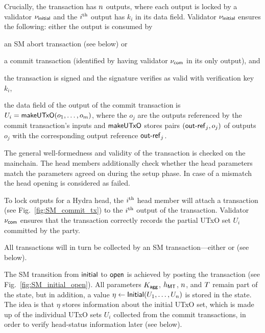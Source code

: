 Crucially, the \mtxInit{} transaction has $n$ outputs, where each
output is locked by a validator $\nu_\mathsf{initial}$ and the $i^{\text{th}}$ output has
$k_i$ in its data field.  Validator $\nu_\mathsf{initial}$ ensures the following:
either the output is consumed by \begin{menumerate} \item  an SM abort transaction (see
below) or \item a commit transaction (identified by having validator
$\nu_\mathsf{com}$ in its only output), and
\begin{menumerate}
\item the transaction is signed and the signature verifies as valid with verification key $k_i$,
\item the data field of the output of the commit transaction is
  $U_i = \mathsf{makeUTxO}(o_1,\ldots,o_m)$, where the $o_j$ are the outputs
  referenced by the commit transaction's inputs and $\mathsf{makeUTxO}$
  stores pairs $(\mathsf{out\textsf{-}{}ref}_j,o_j)$ of outputs $o_j$ with the
  corresponding output reference $\mathsf{out\textsf{-}{}ref}_j$.
\end{menumerate}
\end{menumerate}

The general well-formedness and validity of the \mtxInit{}
transaction is checked on the mainchain. The head members additionally check whether the head parameters
match the parameters agreed on during the setup phase. In case of a
mismatch the head opening is considered as failed.


To lock outputs %
for a Hydra head, the $i^{\text{th}}$
head member will attach a \mtxCom{} transaction (see
Fig.~\ref{fig:SM_commit_tx}) to the $i^{\text{th}}$ output of the
\mtxInit{} transaction.  Validator $\nu_\mathsf{com}$ ensures that the \mtxCom{}
transaction correctly records the partial UTxO set $U_i$ committed
by the party.

All \mtxCom{} transactions will in turn be collected by an SM
transaction---either \mtxCCom{} or \mtxAbort{} (see below).


 The SM transition from $\mathsf{initial}$
to $\mathsf{open}$ is achieved by posting the \mtxCCom{} transaction (see
Fig.~\ref{fig:SM_initial_open}).  All parameters $K_{\mathsf{agg}}$, $h_{\mathsf{MT}}$,
$n$, and $T$ remain part of the state, but in addition, a value
$\eta \gets \mathsf{Initial}(U_1,\ldots,U_n)$ is stored in the state.
The idea is that $\eta$ stores information about the initial UTxO set,
which is made up of the individual UTxO sets $U_i$ collected from the
commit transactions, in order to verify head-status information later
(see below).

